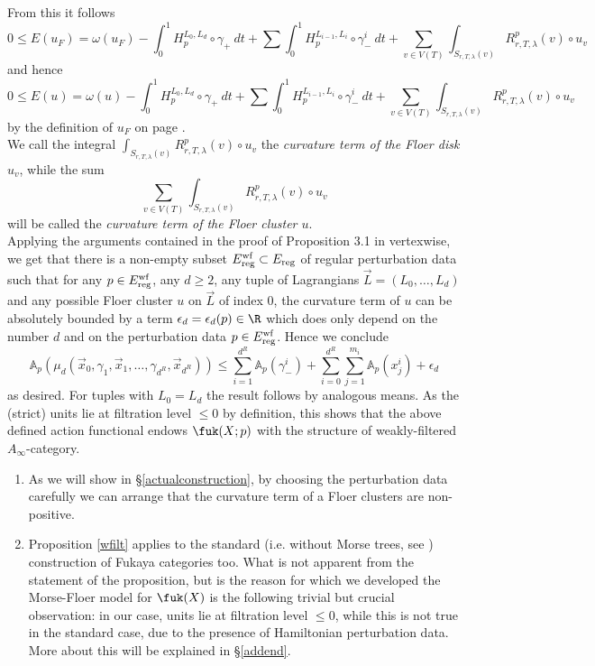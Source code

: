 	From this it follows $$0\leq E(u_F) = \omega(u_F) - \int_0^1 H^{L_0,L_d}_p \circ \gamma_+\ dt + \sum  \int_0^1 H^{L_{i-1},L_i}_p \circ \gamma_-^i\ dt + \sum_{v\in V(T)}\int_{S_{r,T,\lambda}(v)} R^p_{r,T,\lambda}(v)\circ u_v$$ and hence $$0\leq E(u) = \omega(u) - \int_0^1 H^{L_0,L_d}_p \circ \gamma_+\ dt + \sum  \int_0^1 H^{L_{i-1},L_i}_p \circ \gamma_-^i\ dt + \sum_{v\in V(T)} \int_{S_{r,T,\lambda}(v)} R^p_{r,T,\lambda}(v)\circ u_v $$ by the definition of $u_F$ on page \pageref{uf}.\\
	We call the integral $\int_{S_{r,T,\lambda}(v)} R^p_{r,T,\lambda}(v)\circ u_v $ the \textit{curvature term of the Floer disk $u_v$}, while the sum $$\sum_{v\in V(T)} \int_{S_{r,T,\lambda}(v)} R^p_{r,T,\lambda}(v)\circ u_v$$ will be called the \textit{curvature term of the Floer cluster $u$}.\\
	Applying the arguments contained in the proof of Proposition 3.1 in \cite{Bi-Co-Sh:LagrSh} vertexwise, we get that there is a non-empty subset $E^\textnormal{wf}_\textnormal{reg}\subset E_\textnormal{reg}$ of regular perturbation data such that for any $p\in E^\textnormal{wf}_\textnormal{reg}$, any $d\geq 2$, any tuple of Lagrangians $\vec{L}=(L_0,\ldots, L_d)$ and any possible Floer cluster $u$ on $\vec{L}$ of index $0$, the curvature term of $u$ can be absolutely bounded by a term $\epsilon_d= \epsilon_d(p)\in \R$ which does only depend on the number $d$ and on the perturbation data $p\in E^\textnormal{wf}_\textnormal{reg}$. Hence we conclude $$\mathbb{A}_p(\mu_d(\vec{x}_0, \gamma_1, \vec{x}_1,\ldots,\gamma_{d^R}, \vec{x}_{d^R}))\leq \sum_{i=1}^{d^R} \mathbb{A}_p(\gamma_-^i)+ \sum_{i=0}^{d^R}\sum_{j=1}^{m_i}\mathbb{A}_p(x_j^i) + \epsilon_d$$ as desired. For tuples with $L_0=L_d$ the result follows by analogous means. As the (strict) units lie at filtration level $\leq 0$ by definition, this shows that the above defined action functional endows $\fuk(X;p)$ with the structure of weakly-filtered $A_\infty$-category.
	
	
	\begin{rem}\label{rem214}
		\begin{enumerate}
			\item As we will show in \S \ref{actualconstruction}, by choosing the perturbation data carefully we can arrange that the curvature term of a Floer clusters are non-positive.
			\item Proposition \ref{wfilt} applies to the standard (i.e. without Morse trees, see \cite{Se:book-fukaya-categ}) construction of Fukaya categories too. What is not apparent from the statement of the proposition, but is the reason for which we developed the Morse-Floer model for $\fuk(X)$ is the following trivial but crucial observation: in our case, units lie at filtration level $\leq0$, while this is not true in the standard case, due to the presence of Hamiltonian perturbation data. More about this will be explained in \S \ref{addend}.
		\end{enumerate}
	\end{rem}
	
